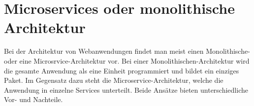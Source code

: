 \section{Microservices oder monolithische Architektur} \label{sec:MicroservicesOrMonolith}
\begin{comment}
    --> Microservices
        - Unterteilung
        - Vorteile gegenüber einem Monolithen 
\end{comment}

Bei der Architektur von Webanwendungen findet man meist einen Monolithische- oder eine Microsrvice-Architektur vor. Bei einer Monolithischen-Architektur wird die gesamte Anwendung als eine Einheit programmiert und bildet ein einziges Paket. Im Gegensatz dazu steht die Microservice-Architektur, welche die Anwendung in einzelne Services unterteilt. Beide Ansätze bieten unterschiedliche Vor- und Nachteile.  



